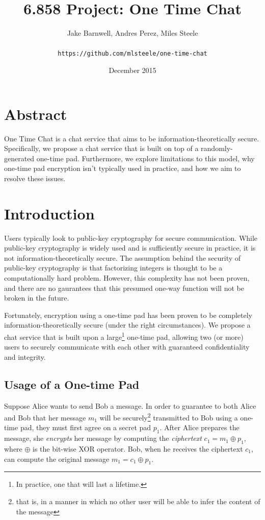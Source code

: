 \documentclass[twocolumn]{article}
\title{6.858 Project: One Time Chat}
\author{
Jake Barnwell, Andres Perez, Miles Steele\\\\
\texttt{https://github.com/mlsteele/one-time-chat}
}
\date{December 2015}
\begin{document}
\maketitle

\section{Abstract}
One Time Chat is a chat service that aims to be information-theoretically secure. Specifically, we propose a chat service that is built on top of a randomly-generated one-time pad. Furthermore, we explore limitations to this model, why one-time pad encryption isn't typically used in practice, and how we aim to resolve these issues.

\section{Introduction}
Users typically look to public-key cryptography for secure communication. While public-key cryptography is widely used and is sufficiently secure in practice, it is not information-theoretically secure. The assumption behind the security of public-key cryptography is that factorizing integers is thought to be a computationally hard problem. However, this complexity has not been proven, and there are no gaurantees that this presumed one-way function will not be broken in the future.
 
Fortunately, encryption using a one-time pad has been proven to be completely information-theoretically secure (under the right circumstances). We propose a chat service that is built upon a large\footnote{
In practice, one that will last a lifetime.
}
one-time pad, allowing two (or more) users to securely communicate with each other with guaranteed confidentiality and integrity.

\subsection{Usage of a One-time Pad}
Suppose Alice wants to send Bob a message. In order to guarantee to both Alice and Bob that her message $m_1$ will be securely\footnote{
that is, in a manner in which no other user will be able to infer the content of the message
}
transmitted to Bob using a one-time pad, they must first agree on a secret pad $p_{1}$. After Alice prepares the message, she \emph{encrypts} her message by computing the \emph{ciphertext} $c_{1} = m_{1} \oplus p_{1}$, where $\oplus$ is the bit-wise XOR operator. Bob, when he receives the ciphertext $c_1$, can compute the original message $m_1 = c_1 \oplus p_1$.
\end{document}
